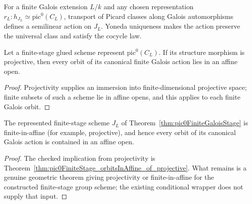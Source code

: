 \begin{definition}
  \label{def:pic0FiniteGaloisAction}
  \leanok
  For a finite Galois extension \(L/k\) and any chosen representation
  \(r_L:h_{J_L}\simeq\mathrm{pic}^0(C_L)\), transport of Picard classes along Galois
  automorphisms defines a semilinear action on \(J_L\).  Yoneda uniqueness makes the action
  preserve the universal class and satisfy the cocycle law.
\end{definition}

\begin{theorem}
  \label{thm:pic0FiniteStage_orbitsInAffine_of_projective}
  \leanok
  Let a finite-stage glued scheme represent \(\mathrm{pic}^0(C_L)\).  If its structure
  morphism is projective, then every orbit of its canonical finite Galois action lies in an
  affine open.
\end{theorem}
\begin{proof}
  \leanok
  Projectivity supplies an immersion into finite-dimensional projective space; finite subsets
  of such a scheme lie in affine opens, and this applies to each finite Galois orbit.
\end{proof}

\begin{theorem}
  \label{thm:pic0FiniteStage_orbitsInAffine}
  \notready
  The represented finite-stage scheme \(J_L\) of
  Theorem~\ref{thm:pic0FiniteGaloisStage} is finite-in-affine (for example, projective), and
  hence every orbit of its canonical Galois action is contained in an affine open.
\end{theorem}
\begin{proof}
  The checked implication from projectivity is
  Theorem~\ref{thm:pic0FiniteStage_orbitsInAffine_of_projective}.  What remains is a genuine
  geometric theorem giving projectivity or finite-in-affine for the constructed finite-stage
  group scheme; the existing conditional wrapper does not supply that input.
\end{proof}

